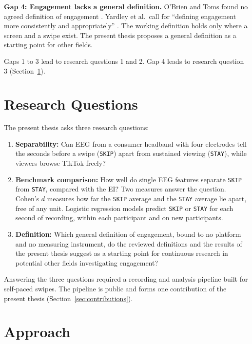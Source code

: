 \documentclass[12pt,a4paper]{report}
\begin{document}
\textbf{Gap 4: Engagement lacks a general definition.} O'Brien and Toms found no agreed definition of engagement \cite{obrien_what_2008}. Yardley et al.\ call for ``defining engagement more consistently and appropriately'' \cite{yardley_understanding_2016}. The working definition holds only where a screen and a swipe exist. The present thesis proposes a general definition as a starting point for other fields.

Gaps 1 to 3 lead to research questions 1 and 2. Gap 4 leads to research question 3 (Section~\ref{sec:intro_research_questions}).

\section{Research Questions}
\label{sec:intro_research_questions}

The present thesis asks three research questions:

\begin{enumerate}
    \item \textbf{Separability:} Can EEG from a consumer headband with four electrodes tell the seconds before a swipe (\texttt{SKIP}) apart from sustained viewing (\texttt{STAY}), while viewers browse TikTok freely?
    \item \textbf{Benchmark comparison:} How well do single EEG features separate \texttt{SKIP} from \texttt{STAY}, compared with the EI? Two measures answer the question. Cohen's $d$ measures how far the \texttt{SKIP} average and the \texttt{STAY} average lie apart, free of any unit. Logistic regression models predict \texttt{SKIP} or \texttt{STAY} for each second of recording, within each participant and on new participants.
    \item \textbf{Definition:} Which general definition of engagement, bound to no platform and no measuring instrument, do the reviewed definitions and the results of the present thesis suggest as a starting point for continuous research in potential other fields investigating engagement?
\end{enumerate}

Answering the three questions required a recording and analysis pipeline built for self-paced swipes. The pipeline is public and forms one contribution of the present thesis (Section~\ref{sec:contributions}).

\section{Approach}
\end{document}
